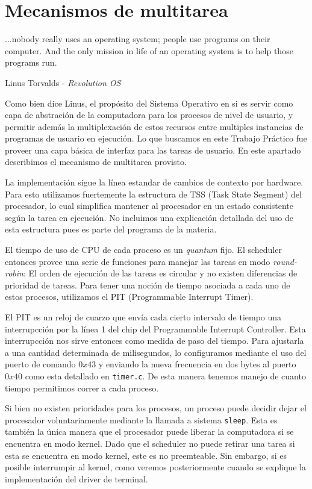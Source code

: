 \section{Mecanismos de multitarea}
\label{sec::multitask}

\epigraph{...nobody really uses an operating system; people use programs on their computer. And the only mission in life of an operating system is to help those programs run.}{Linus Torvalds - \textit{Revolution OS}}

Como bien dice Linus, el prop\'osito del Sistema Operativo en si es servir como capa de abstraci\'on de la
computadora para los procesos de nivel de usuario, y permitir adem\'as la multiplexaci\'on
de estos recursos entre multiples instancias de programas de usuario en ejecuci\'on. Lo que
buscamos en este Trabajo Pr\'actico fue proveer una capa b\'asica de interfaz para las tareas
de usuario. En este apartado describimos el mecanismo de multitarea provisto.

La implementaci\'on sigue la l\'inea estandar de cambios de contexto por hardware. Para esto
utilizamos fuertemente la estructura de TSS (Task State Segment) del procesador, lo cual
simplifica mantener al procesador en un estado consistente seg\'un la tarea en ejecuci\'on.
No incluimos una explicaci\'on detallada del uso de esta estructura pues es parte del programa
de la materia.

El tiempo de uso de CPU de cada proceso es un \textit{quantum} fijo. El scheduler entonces provee
una serie de funciones para manejar las tareas en modo \textit{round-robin}: El orden de ejecuci\'on
de las tareas es circular y no existen diferencias de prioridad de tareas. Para tener una noci\'on
de tiempo asociada a cada uno de estos procesos, utilizamos el PIT (Programmable Interrupt Timer).

El PIT es un reloj de cuarzo que env\'ia cada cierto intervalo de tiempo una interrupcci\'on por la l\'inea
1 del chip del Programmable Interrupt Controller. Esta interrupcci\'on nos sirve entonces como medida de paso
del tiempo. Para ajustarla a una cantidad determinada de milisegundos, lo configuramos mediante el uso del
puerto de comando $0x43$ y enviando la nueva frecuencia en dos bytes al puerto $0x40$ como esta detallado en 
\texttt{timer.c}. De esta manera tenemos manejo de cuanto tiempo permitimos correr a cada proceso.

Si bien no existen prioridades para los procesos, un proceso puede decidir dejar el procesador voluntariamente
mediante la llamada a sistema \texttt{sleep}. Esta es tambi\'en la \'unica manera que el procesador puede liberar
la computadora si se encuentra en modo kernel. Dado que el scheduler no puede retirar una tarea si esta se encuentra
en modo kernel, este es no preemteable. Sin embargo, si es posible interrumpir al kernel, como veremos posteriormente
cuando se explique la implementaci\'on del driver de terminal.

